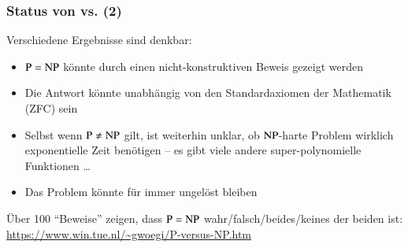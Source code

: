 \documentclass[onlymath]{beamer}
\begin{document}
\begin{frame}\frametitle{Status von  vs.  (2)}

  Verschiedene Ergebnisse sind denkbar:\pause
  \begin{itemize}
	\item ${\textsc{P}} =  {\textsc{NP}}$ könnte durch einen nicht-konstruktiven Beweis gezeigt werden\pause
	\item Die Antwort könnte unabhängig von den Standardaxiomen der Mathematik (ZFC) sein\pause
	\item Selbst wenn ${\textsc{P}} \neq {\textsc{NP}}$ gilt, ist weiterhin unklar, ob ${\textsc{NP}}$-harte Problem wirklich exponentielle Zeit benötigen -- es gibt viele andere super-polynomielle Funktionen \ldots\pause
	\item Das Problem könnte für immer ungelöst bleiben\pause
  \end{itemize}\bigskip
  
  Über 100 "`Beweise"' zeigen, dass ${\textsc{P}} = {\textsc{NP}}$ wahr/falsch/beides/keines der beiden ist: \url{https://www.win.tue.nl/~gwoegi/P-versus-NP.htm}
   
\end{frame}

% 
%    
\end{document}
